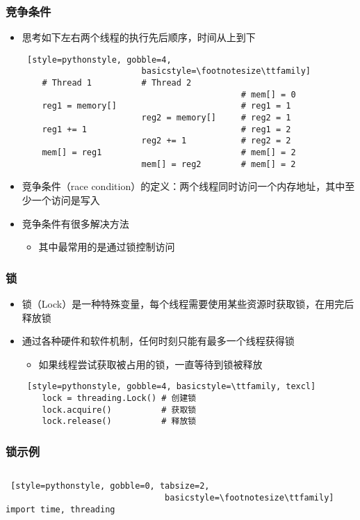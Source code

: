 \begin{CJK}{UTF8}{gbsn}
\begin{frame}[fragile]
	\frametitle{竞争条件}
	\begin{itemize}
	\item 思考如下左右两个线程的执行先后顺序，时间从上到下
	\begin{lstlisting} [style=pythonstyle, gobble=4,
						basicstyle=\footnotesize\ttfamily]
	# Thread 1			# Thread 2
											# mem[] = 0
	reg1 = memory[]							# reg1 = 1
						reg2 = memory[]		# reg2 = 1
	reg1 += 1								# reg1 = 2
						reg2 += 1			# reg2 = 2
	mem[] = reg1							# mem[] = 2
						mem[] = reg2		# mem[] = 2
	\end{lstlisting}
	\item 竞争条件（race
			condition）的定义：两个线程同时访问一个内存地址，其中至少一个访问是写入
	\item 竞争条件有很多解决方法
		\begin{itemize}
		\item 其中最常用的是通过锁控制访问
		\end{itemize}
	\end{itemize}
\end{frame}

\begin{frame}[fragile]
	\frametitle{锁}
	\begin{itemize}
	\item 锁（Lock）是一种特殊变量，每个线程需要使用某些资源时获取锁，在用完后释放锁
	\item 通过各种硬件和软件机制，任何时刻只能有最多一个线程获得锁
		\begin{itemize}
		\item 如果线程尝试获取被占用的锁，一直等待到锁被释放
		\end{itemize}
	\begin{lstlisting} [style=pythonstyle, gobble=4, basicstyle=\ttfamily, texcl]
	lock = threading.Lock()	# 创建锁
	lock.acquire()			# 获取锁
	lock.release()			# 释放锁
	\end{lstlisting}
	\end{itemize}
\end{frame}

\begin{frame}[fragile]
	\frametitle{锁示例}
	\begin{columns}[T]
		\begin{column}[T]{.5\textwidth}
			\begin{lstlisting} [style=pythonstyle, gobble=0, tabsize=2,
								basicstyle=\footnotesize\ttfamily]
import time, threading


\end{lstlisting}
\end{column}
\end{columns}
\end{frame}
\end{CJK}
